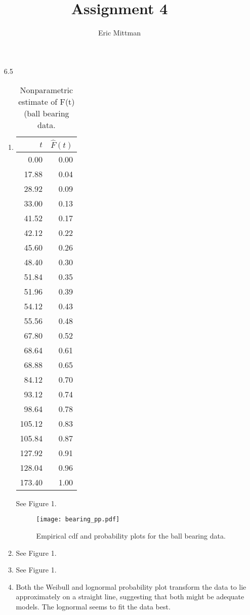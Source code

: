 \documentclass[12pt]{article}\usepackage[]{graphicx}\usepackage[]{color}
\author{Eric Mittman}
\title{Assignment 4}
\begin{document}
  \maketitle
\begin{enumerate}
  \item[6.5]
  \begin{enumerate}
    \item
\begin{table}[ht]
\centering
\begin{tabular}{rr}
  \hline
$t$ & $\widehat{F}(t)$ \\ 
  \hline
0.00 & 0.00 \\ 
  17.88 & 0.04 \\ 
  28.92 & 0.09 \\ 
  33.00 & 0.13 \\ 
  41.52 & 0.17 \\ 
  42.12 & 0.22 \\ 
  45.60 & 0.26 \\ 
  48.40 & 0.30 \\ 
  51.84 & 0.35 \\ 
  51.96 & 0.39 \\ 
  54.12 & 0.43 \\ 
  55.56 & 0.48 \\ 
  67.80 & 0.52 \\ 
  68.64 & 0.61 \\ 
  68.88 & 0.65 \\ 
  84.12 & 0.70 \\ 
  93.12 & 0.74 \\ 
  98.64 & 0.78 \\ 
  105.12 & 0.83 \\ 
  105.84 & 0.87 \\ 
  127.92 & 0.91 \\ 
  128.04 & 0.96 \\ 
  173.40 & 1.00 \\ 
   \hline
\end{tabular}
\caption{Nonparametric estimate of F(t) (ball bearing data.} 
\end{table}

    See Figure 1.
    \begin{figure}
    \texttt{[image: bearing\_pp.pdf]}
    \caption{Empirical cdf and probability plots for the ball bearing data.}
    \end{figure}
    \item
    See Figure 1.
    \item
    See Figure 1.
    \item
    Both the Weibull and lognormal probability plot transform the data to lie approximately on a straight line, suggesting that both might be adequate models. The lognormal seems to fit the data best.
  \end{enumerate}
  

\end{enumerate}
\end{document}
